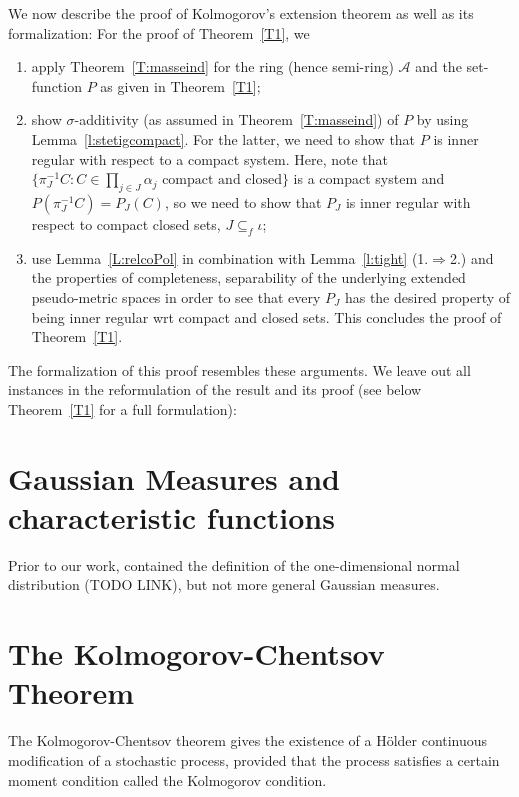 \documentclass[lean]{Draft}
\begin{document}
We now describe the proof of Kolmogorov's extension theorem as well as
its formalization: For the proof of Theorem~\ref{T1}, we
\begin{enumerate}
  \item apply Theorem~\ref{T:masseind} for the ring (hence semi-ring)
    $\mathcal A$ and the set-function $P$ as given in
    Theorem~\ref{T1};
  \item show $\sigma$-additivity (as assumed in
    Theorem~\ref{T:masseind}) of $P$ by using
    Lemma~\ref{l:stetigcompact}. For the latter, we need to show that
    $P$ is inner regular with respect to a compact system. Here, note
    that $\{\pi_J^{-1}C : C \in \prod_{j\in J} \alpha_j \text{ compact
      and closed}\}$ is a compact system and $P(\pi_J^{-1}C) =
    P_J(C)$, so we need to show that $P_J$ is inner regular with
    respect to compact closed sets, $J\subseteq_f \iota$;
  \item use Lemma~\ref{L:relcoPol} in combination with
    Lemma~\ref{l:tight} (1.$\Rightarrow$2.) and the properties of
    completeness, separability of the underlying extended
    pseudo-metric spaces in order to see that every $P_J$ has the
    desired property of being inner regular wrt compact and closed
    sets. This concludes the proof of Theorem~\ref{T1}.
\end{enumerate}
The formalization of this proof resembles these arguments. We leave
out all instances in the reformulation of the result and its proof
(see below Theorem~\ref{T1} for a full formulation):




\section{Gaussian Measures and characteristic functions}

Prior to our work, \mathlib contained the definition of the one-dimensional normal distribution (TODO LINK), but not more general Gaussian measures.





\section{The Kolmogorov-Chentsov Theorem}
\label{S:continuity}

The Kolmogorov-Chentsov theorem gives the existence of a Hölder continuous modification of a stochastic process, provided that the process satisfies a certain moment condition called the Kolmogorov condition.
\end{document}
